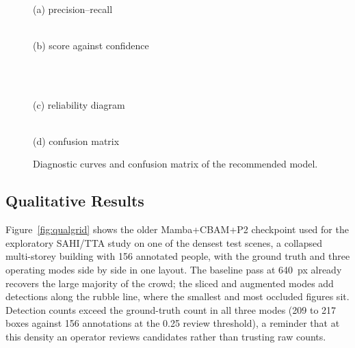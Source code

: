 \documentclass[12pt,a4paper,oneside]{report}
\begin{document}
\begin{figure}[tbp]
  \centering
  \begin{minipage}[t]{0.49\linewidth}\centering
    \\[2pt]
    {\small (a) precision--recall}
  \end{minipage}\hfill
  \begin{minipage}[t]{0.49\linewidth}\centering
    \\[2pt]
    {\small (b) score against confidence}
  \end{minipage}\\[6pt]
  \begin{minipage}[t]{0.49\linewidth}\centering
    \\[2pt]
    {\small (c) reliability diagram}
  \end{minipage}\hfill
  \begin{minipage}[t]{0.49\linewidth}\centering
    \\[2pt]
    {\small (d) confusion matrix}
  \end{minipage}
  \caption{Diagnostic curves and confusion matrix of the recommended model.}
  \label{fig:diag}
\end{figure}

\subsection{Qualitative Results}
\label{sec:qual}
Figure~\ref{fig:qualgrid} shows the older Mamba+CBAM+P2 checkpoint used for the
exploratory SAHI/TTA study on one of the densest test scenes, a collapsed
multi-storey building with 156 annotated people, with the ground truth and
three operating modes side by side in one layout.
The baseline pass at 640~px already recovers the large majority of the crowd;
the sliced and augmented modes add detections along the rubble line, where
the smallest and most occluded figures sit. Detection counts exceed the
ground-truth count in all three modes (209 to 217 boxes against 156
annotations at the 0.25 review threshold), a reminder that at this density an
operator reviews candidates rather than trusting raw counts.
\end{document}
